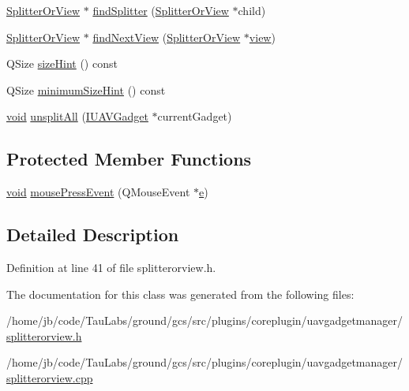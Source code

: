 \begin{DoxyCompactItemize}
\item 
\hyperlink{class_core_1_1_internal_1_1_splitter_or_view}{\-Splitter\-Or\-View} $\ast$ \hyperlink{group___core_plugin_ga89d985d2b5b76f8fe7c5f3a6864501d9}{find\-Splitter} (\hyperlink{class_core_1_1_internal_1_1_splitter_or_view}{\-Splitter\-Or\-View} $\ast$child)
\item 
\hyperlink{class_core_1_1_internal_1_1_splitter_or_view}{\-Splitter\-Or\-View} $\ast$ \hyperlink{group___core_plugin_ga473bc573c4330a7de38e9ca7222b72c5}{find\-Next\-View} (\hyperlink{class_core_1_1_internal_1_1_splitter_or_view}{\-Splitter\-Or\-View} $\ast$\hyperlink{group___core_plugin_ga885a960ed8f9cdcfa3e01e739743f93d}{view})
\item 
\-Q\-Size \hyperlink{group___core_plugin_gabe56a9cd1822e47d15cf0e896917e129}{size\-Hint} () const 
\item 
\-Q\-Size \hyperlink{group___core_plugin_ga653d5db7b113739e805ae097aaa63b25}{minimum\-Size\-Hint} () const 
\item 
\hyperlink{group___u_a_v_objects_plugin_ga444cf2ff3f0ecbe028adce838d373f5c}{void} \hyperlink{group___core_plugin_gabd07fabb713be54a103c57a8842eacee}{unsplit\-All} (\hyperlink{class_core_1_1_i_u_a_v_gadget}{\-I\-U\-A\-V\-Gadget} $\ast$current\-Gadget)
\end{DoxyCompactItemize}
\subsection*{\-Protected \-Member \-Functions}
\begin{DoxyCompactItemize}
\item 
\hyperlink{group___u_a_v_objects_plugin_ga444cf2ff3f0ecbe028adce838d373f5c}{void} \hyperlink{group___core_plugin_ga73faf601d8ba03838e2e6c0c82554719}{mouse\-Press\-Event} (\-Q\-Mouse\-Event $\ast$\hyperlink{_o_p_plots_8m_a9425be9aab51621e317ba7ade564b570}{e})
\end{DoxyCompactItemize}


\subsection{\-Detailed \-Description}


\-Definition at line 41 of file splitterorview.\-h.



\-The documentation for this class was generated from the following files\-:\begin{DoxyCompactItemize}
\item 
/home/jb/code/\-Tau\-Labs/ground/gcs/src/plugins/coreplugin/uavgadgetmanager/\hyperlink{splitterorview_8h}{splitterorview.\-h}\item 
/home/jb/code/\-Tau\-Labs/ground/gcs/src/plugins/coreplugin/uavgadgetmanager/\hyperlink{splitterorview_8cpp}{splitterorview.\-cpp}\end{DoxyCompactItemize}
